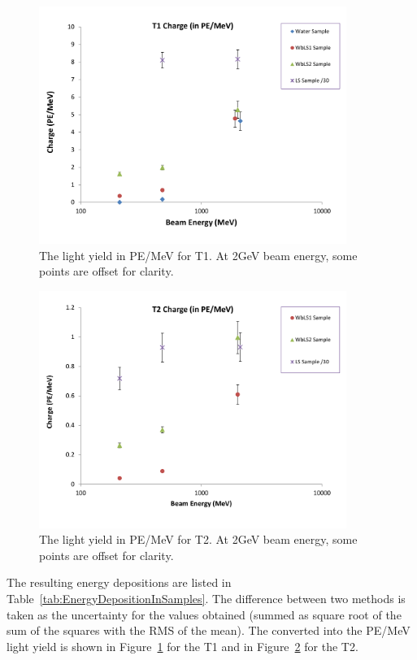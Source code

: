 \documentclass[preprint,12pt]{elsarticle}
\begin{document}
\begin{figure}[ht]
	\centering
		\includegraphics[width=100mm]{tub1signalInPEperMEV.pdf}
	\caption{The light yield in PE/MeV for T1. At 2GeV beam energy, some points are offset for clarity.}
	\label{fig:tub1signalInPEperMeV}
\end{figure}

\begin{figure}[ht]
	\centering
		\includegraphics[width=100mm]{tub2signalInPEperMEV.pdf}
	\caption{The light yield in PE/MeV for T2. At 2GeV beam energy, some points are offset for clarity.}
	\label{fig:tub2signalInPEperMeV}
\end{figure}

The resulting energy depositions are listed in Table~\ref{tab:EnergyDepositionInSamples}. The difference between two methods is taken as the uncertainty for the values obtained (summed as square root of the sum of the squares with the RMS of the mean). The converted into the PE/MeV light yield is shown in Figure~\ref{fig:tub1signalInPEperMeV} for the T1 and in Figure~\ref{fig:tub2signalInPEperMeV} for the T2.
\end{document}
